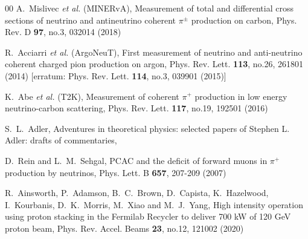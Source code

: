 \documentclass[aps,prl,twocolumn,superscriptaddress,nofootinbib]{revtex4-1}
\begin{document}
\begin{thebibliography}{00}
A.~Mislivec \textit{et al.} (MINERvA),
Measurement of total and differential cross sections of neutrino and antineutrino coherent $\pi^\pm$ production on carbon,
Phys. Rev. D \textbf{97}, no.3, 032014 (2018)

R.~Acciarri \textit{et al.} (ArgoNeuT),
First measurement of neutrino and anti-neutrino coherent charged pion production on argon,
Phys. Rev. Lett. \textbf{113}, no.26, 261801 (2014)
[erratum: Phys. Rev. Lett. \textbf{114}, no.3, 039901 (2015)]

K.~Abe \textit{et al.} (T2K),
Measurement of coherent $\pi^{+}$ production in low energy neutrino-carbon scattering,
Phys. Rev. Lett. \textbf{117}, no.19, 192501 (2016)

S.~L.~Adler,
Adventures in theoretical physics: selected papers of Stephen L. Adler: drafts of commentaries,

D.~Rein and L.~M.~Sehgal,
PCAC and the deficit of forward muons in $\pi^{+}$ production by neutrinos,
Phys. Lett. B \textbf{657}, 207-209 (2007)

R.~Ainsworth, P.~Adamson, B.~C.~Brown, D.~Capista, K.~Hazelwood, I.~Kourbanis, D.~K.~Morris, M.~Xiao and M.~J.~Yang,
High intensity operation using proton stacking in the Fermilab Recycler to deliver 700 kW of 120 GeV proton beam,
Phys. Rev. Accel. Beams \textbf{23}, no.12, 121002 (2020)


\end{thebibliography}
\end{document}
